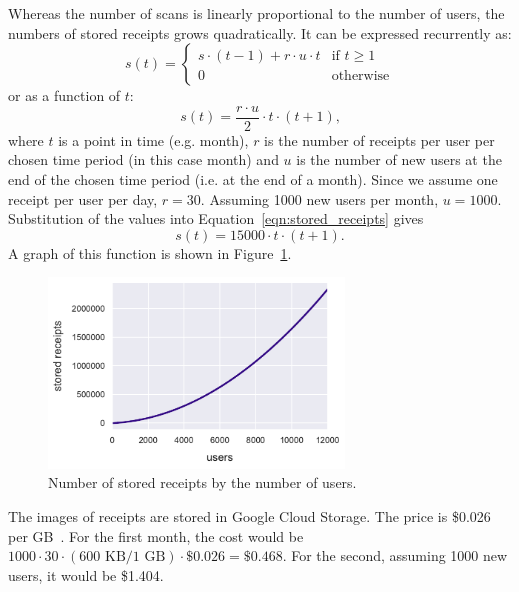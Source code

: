 \documentclass[
  digital, %
  table,   %
  oneside, %
  lof,     %
  lot,     %
]{fithesis3}
\begin{document}
Whereas the number of scans is linearly proportional to the number of users, the numbers of stored receipts grows quadratically. It can be expressed recurrently as: 
\begin{equation}
    s(t) = \begin{cases}
        s \cdot (t-1) + r \cdot u \cdot t & \text{if }t\geq1\\
        0 & \text{otherwise}
    \end{cases}
\end{equation}
or as a function of $t$:
\begin{equation}
\label{eqn:stored_receipts}
s(t) = \frac{r \cdot u}{2} \cdot t \cdot (t + 1)\text{,}
\end{equation}
where $t$ is a point in time (e.g. month), $r$ is the number of receipts per user per chosen time period (in this case month) and $u$ is the number of new users at the end of the chosen time period (i.e. at the end of a month). Since we assume one receipt per user per day, $r = 30$. Assuming \num{1000} new users per month, $u = \num{1000}$. 
Substitution of the values into Equation~\ref{eqn:stored_receipts} gives
\begin{equation}
s(t) = \num{15000} \cdot t \cdot (t + 1)\text{.}
\end{equation}
A graph of this function is shown in Figure~\ref{fig:receipts_by_users}.

\begin{figure}
    \begin{center}
        \includegraphics[width=0.7\textwidth]{figures/graphs/receipts_by_users}
    \end{center}
    \caption{Number of stored receipts by the number of users.}
    \label{fig:receipts_by_users}
\end{figure}

The images of receipts are stored in Google Cloud Storage. The price is \$0.026 per GB~\cite{CloudStoragePricing}. For the first month, the cost would be $\num{1000} \cdot 30 \cdot (600\text{ KB} / 1\text{ GB}) \cdot \$0.026 = \$0.468$.
For the second, assuming \num{1000} new users, it would be \$1.404.
\end{document}
